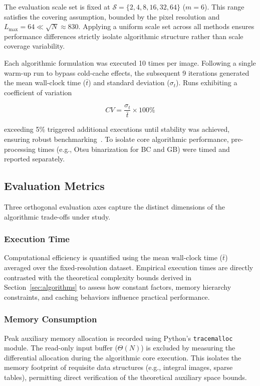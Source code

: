 The evaluation scale set is fixed at $\mathcal{S} = \{2, 4, 8, 16, 32, 64\}$ ($m = 6$). This range satisfies the covering assumption, bounded by the pixel resolution and $L_{\max} = 64 \ll \sqrt{N} \approx 830$. Applying a uniform scale set across all methods ensures performance differences strictly isolate algorithmic structure rather than scale coverage variability.

Each algorithmic formulation was executed 10 times per image. Following a single warm-up run to bypass cold-cache effects, the subsequent 9 iterations generated the mean wall-clock time ($\bar{t}$) and standard deviation ($\sigma_t$). Runs exhibiting a coefficient of variation

\begin{equation}
  CV = \frac{\sigma_t}{\bar{t}} \times 100\%
  \label{eq:cv}
\end{equation}

\noindent exceeding 5\% triggered additional executions until stability was achieved, ensuring robust benchmarking~\cite{Flemming1986}. To isolate core algorithmic performance, pre-processing times (e.g., Otsu binarization for BC and GB) were timed and reported separately.

\subsection{Evaluation Metrics}
\label{subsec:metrics}

Three orthogonal evaluation axes capture the distinct dimensions of the algorithmic trade-offs under study.

\subsubsection{Execution Time}
Computational efficiency is quantified using the mean wall-clock time ($\bar{t}$) averaged over the fixed-resolution dataset. Empirical execution times are directly contrasted with the theoretical complexity bounds derived in Section~\ref{sec:algorithms} to assess how constant factors, memory hierarchy constraints, and caching behaviors influence practical performance.

\subsubsection{Memory Consumption}
Peak auxiliary memory allocation is recorded using Python's \texttt{tracemalloc} module. The read-only input buffer ($\Theta(N)$) is excluded by measuring the differential allocation during the algorithmic core execution. This isolates the memory footprint of requisite data structures (e.g., integral images, sparse tables), permitting direct verification of the theoretical auxiliary space bounds.

